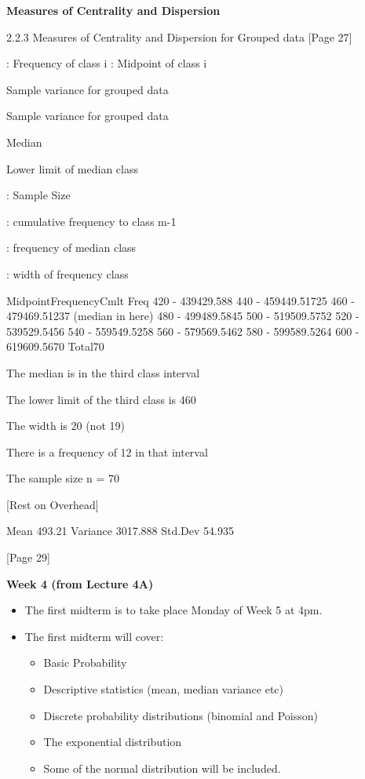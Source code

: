 \documentclass[]{report}
\begin{document}
\textbf{Measures of Centrality and Dispersion}


2.2.3 Measures of Centrality and Dispersion for Grouped data
[Page 27]

: Frequency of class i
: Midpoint of class i

Sample variance for grouped data



Sample variance for grouped data



Median





Lower limit of median class

:      Sample Size

:    cumulative frequency to class m-1

:   frequency of median class 

:   width of frequency class


MidpointFrequencyCmlt Freq
420 - 439429.588
440 - 459449.51725
460 - 479469.51237 (median in here)
480 - 499489.5845
500 - 519509.5752
520 - 539529.5456
540 - 559549.5258
560 - 579569.5462
580 - 599589.5264
600 - 619609.5670
Total70





The median is in the third class interval

The lower limit of the third class is 460

The width is 20 (not 19)

There is a frequency of 12 in that interval

The sample size n = 70




[Rest on Overhead]

Mean  493.21
Variance 3017.888
Std.Dev 54.935 

[Page 29]










{
\textbf{Week 4 (from Lecture 4A)}
\begin{itemize}
\item  The first midterm is to take place Monday of Week 5 at 4pm.
\item  The first midterm will cover:
\begin{itemize}
\item  Basic Probability
\item  Descriptive statistics (mean, median variance etc)
\item  Discrete probability distributions (binomial and Poisson)
\item  The exponential distribution
\item  Some of the normal distribution will be included.
\end{itemize}
\end{itemize}
}
\end{document}
